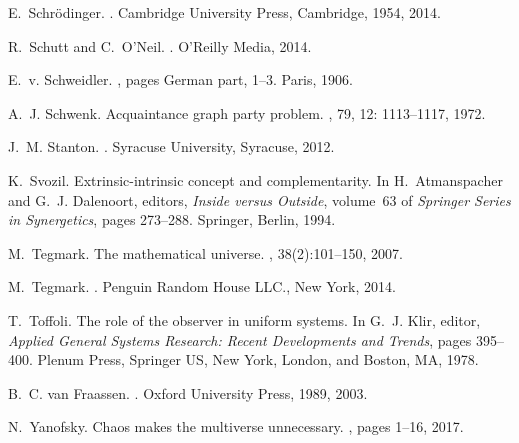 \documentclass[12pt]{article}
\begin{document}
\begin{thebibliography}{10}
E.~Schr{\"{o}}dinger.
.
\newblock Cambridge University Press, Cambridge, 1954, 2014.

R.~Schutt and C.~O'Neil.
.
\newblock O'Reilly Media, 2014.

E.~v. Schweidler.
, pages
  German part, 1--3.
\newblock Paris, 1906.

A.~J. Schwenk.
\newblock Acquaintance graph party problem.
, 79, 12: 1113--1117, 1972.

J.~M. Stanton.
.
\newblock Syracuse University, Syracuse, 2012.

K.~Svozil.
\newblock Extrinsic-intrinsic concept and complementarity.
\newblock In H.~Atmanspacher and G.~J. Dalenoort, editors, {\em Inside versus
  Outside}, volume~63 of {\em Springer Series in Synergetics}, pages 273--288.
  Springer, Berlin, 1994.

M.~Tegmark.
\newblock The mathematical universe.
, 38(2):101--150, 2007.

M.~Tegmark.
.
\newblock Penguin Random House LLC., New York, 2014.

T.~Toffoli.
\newblock The role of the observer in uniform systems.
\newblock In G.~J. Klir, editor, {\em Applied General Systems Research: Recent
  Developments and Trends}, pages 395--400. Plenum Press, Springer US, New
  York, London, and Boston, MA, 1978.

B.~C. van Fraassen.
.
\newblock Oxford University Press, 1989, 2003.

N.~Yanofsky.
\newblock Chaos makes the multiverse unnecessary.
, pages 1--16, 2017.

\end{thebibliography}
\end{document}
